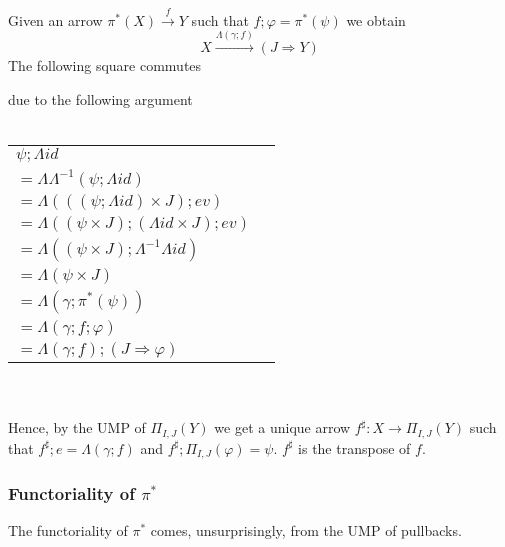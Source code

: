 \documentclass{article}
\begin{document}
Given an arrow $\pi^*(X) \overset{f}{\longrightarrow} Y$ such that $f;\varphi = \pi^*(\psi)$ we obtain 
$$X \overset{\Lambda(\gamma;f)}{\longrightarrow} (J \Rightarrow Y)$$ 
The following square commutes
\begin{center}
\end{center}
due to the following argument\\~\\
\begin{tabular}{ll}
$\psi;\Lambda\mathit{id}$ & \\
$= \Lambda \Lambda^{-1} (\psi;\Lambda \mathit{id})$ & \\
$= \Lambda ( ( (\psi;\Lambda \mathit{id}) \times J);\mathit{ev})$ & \\
$= \Lambda ( (\psi \times J);(\Lambda \mathit{id} \times J);\mathit{ev})$ & \\
$= \Lambda ( (\psi \times J); \Lambda^{-1} \Lambda \mathit{id})$ & \\
$= \Lambda(\psi \times J)$ & \\
$= \Lambda(\gamma;\pi^*(\psi))$ & \\
$= \Lambda(\gamma;f;\varphi)$ & \\
$= \Lambda(\gamma;f);(J \Rightarrow \varphi)$  
\end{tabular}\\~\\
Hence, by the UMP of $\Pi_{I,J}(Y)$ we get a unique arrow $f^\sharp : X \to \Pi_{I,J}(Y)$ such that 
$f^\sharp;e = \Lambda(\gamma;f)$ and $f^\sharp;\Pi_{I,J}(\varphi) = \psi$. $f^\sharp$ is the transpose of $f$.
\subsubsection*{Functoriality of $\pi^*$}

The functoriality of $\pi^*$ comes, unsurprisingly, from the UMP of pullbacks.

\begin{center}
\end{center}
\end{document}
